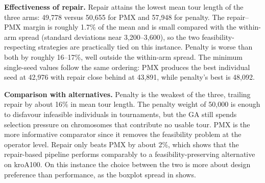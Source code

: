 \textbf{Effectiveness of repair.} Repair attains the lowest mean tour
length of the three arms: 49,778 versus 50,655 for PMX and 57,948 for
penalty. The repair--PMX margin is roughly 1.7\% of the mean and is
small compared with the within-arm spread (standard deviations near
3,200--3,600), so the two feasibility-respecting strategies are
practically tied on this instance. Penalty is worse than both by roughly
16--17\%, well outside the within-arm spread. The minimum single-seed
values follow the same ordering: PMX produces the best individual seed at
42,976 with repair close behind at 43,891, while penalty's best is 48,092.

\textbf{Comparison with alternatives.} Penalty is the weakest of the three,
trailing repair by about 16\% in mean tour length. The penalty weight of
50,000 is enough to disfavour infeasible individuals in tournaments, but
the GA still spends selection pressure on chromosomes that contribute no
usable tour. PMX is the more informative comparator since it removes the
feasibility problem at the operator level. Repair only beats PMX by about
2\%, which shows that the repair-based pipeline performs comparably to a
feasibility-preserving alternative on kroA100. On this instance the choice
between the two is more about design preference than performance, as the
boxplot spread in  shows.
